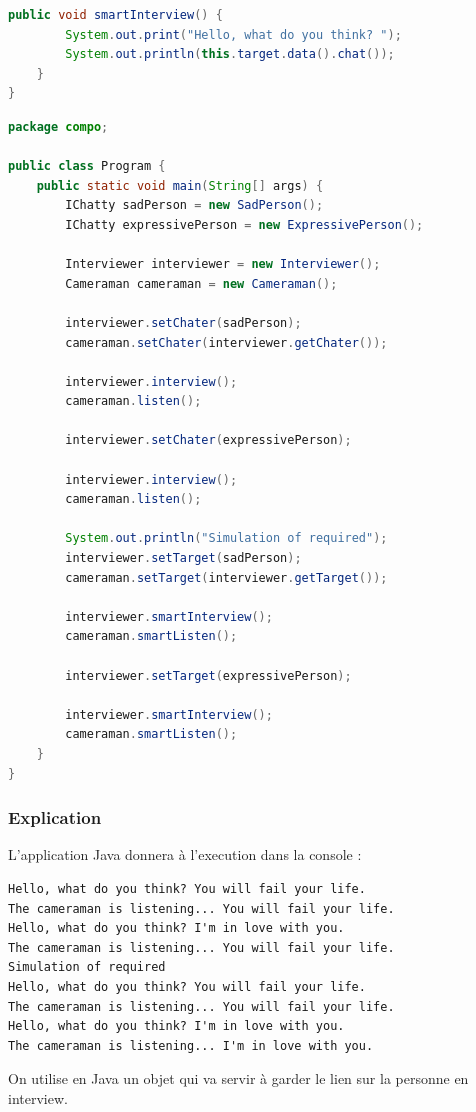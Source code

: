 \documentclass[11pt,a4paper,openany,oneside]{book}
\begin{document}
\begin{appendices}
\begin{lstlisting}[language=Java, frame=single, caption=Interviewer]
    public void smartInterview() {
        System.out.print("Hello, what do you think? ");
        System.out.println(this.target.data().chat());
    }
}
\end{lstlisting}

\clearpage

\begin{lstlisting}[language=Java, frame=single, caption=Program]
package compo;

public class Program {
    public static void main(String[] args) {
        IChatty sadPerson = new SadPerson();
        IChatty expressivePerson = new ExpressivePerson();

        Interviewer interviewer = new Interviewer();
        Cameraman cameraman = new Cameraman();

        interviewer.setChater(sadPerson);
        cameraman.setChater(interviewer.getChater());

        interviewer.interview();
        cameraman.listen();

        interviewer.setChater(expressivePerson);

        interviewer.interview();
        cameraman.listen();

        System.out.println("Simulation of required");
        interviewer.setTarget(sadPerson);
        cameraman.setTarget(interviewer.getTarget());

        interviewer.smartInterview();
        cameraman.smartListen();

        interviewer.setTarget(expressivePerson);

        interviewer.smartInterview();
        cameraman.smartListen();
    }
}
\end{lstlisting}

\subsubsection{Explication}
L'application Java donnera à l'execution dans la console : \begin{lstlisting}[frame=single, caption=output]
Hello, what do you think? You will fail your life. 
The cameraman is listening... You will fail your life.
Hello, what do you think? I'm in love with you. 
The cameraman is listening... You will fail your life. 
Simulation of required 
Hello, what do you think? You will fail your life. 
The cameraman is listening... You will fail your life. 
Hello, what do you think? I'm in love with you. 
The cameraman is listening... I'm in love with you.
\end{lstlisting}
On utilise en Java un objet qui va servir à garder le lien sur la personne en interview.


\end{appendices}
\end{document}
